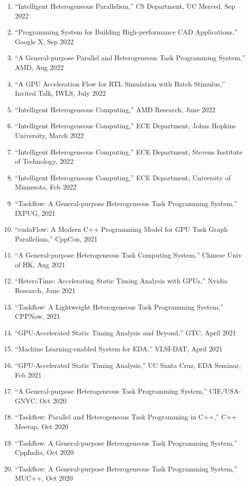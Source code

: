 \documentclass[A4,11pt]{article}
\begin{document}
\begin{enumerate}
  \item ``Intelligent Heterogeneous Parallelism,'' CS Department, UC Merced, Sep 2022
  \item ``Programming System for Building High-performance CAD Applications,'' Google X, Sep 2022
  \item ``A General-purpose Parallel and Heterogeneous Task Programming System,'' AMD, Aug 2022
  \item ``A GPU Acceleration Flow for RTL Simulation with Batch Stimulus,'' Invited Talk, IWLS, July 2022
  \item ``Intelligent Heterogeneous Computing,'' AMD Research, June 2022
  \item ``Intelligent Heterogeneous Computing,'' ECE Department, Johns Hopkins University, March 2022
  \item ``Intelligent Heterogeneous Computing,'' ECE Department, Stevens Institute of Technology, 2022
  \item ``Intelligent Heterogeneous Computing,'' ECE Department, University of Minnesota, Feb 2022
  \item ``Taskflow: A General-purpose Heterogeneous Task Programming System,'' IXPUG, 2021
  \item ``cudaFlow: A Modern C++ Programming Model for GPU Task Graph Parallelism,'' CppCon, 2021
  \item ``A General-purpose Heterogeneous Task Computing System,'' Chinese Univ of HK, Aug 2021
  \item ``HeteroTime: Accelerating Static Timing Analysis with GPUs,'' Nvidia Research, June 2021
  \item ``Taskflow: A Lightweight Heterogeneous Task Programming System,'' CPPNow, 2021
  \item ``GPU-Accelerated Static Timing Analysis and Beyond,'' GTC, April 2021
  \item ``Machine Learning-enabled System for EDA,'' VLSI-DAT, April 2021
  \item ``GPU-Accelerated Static Timing Analysis,'' UC Santa Cruz, EDA Seminar, Feb 2021 
  \item ``A General-purpose Heterogeneous Task Programming System,'' CIE/USA-GNYC, Oct 2020
  \item ``Taskflow: Parallel and Heterogeneous Task Programming in C++,'' C++ Meetup, Oct 2020
  \item ``Taskflow: A General-purpose Heterogeneous Task Programming System,'' CppIndia, Oct 2020
  \item ``Taskflow: A General-purpose Heterogeneous Task Programming System,'' MUC++, Oct 2020

\end{enumerate}
\end{document}

